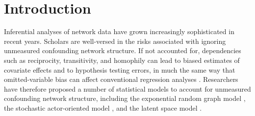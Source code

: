 \documentclass[11pt]{article}
\begin{document}

\section{Introduction}




Inferential analyses of network data have grown increasingly
sophisticated in recent years. Scholars are well-versed in the risks
associated with ignoring unmeasured confounding network structure. If
not accounted for, dependencies such as reciprocity, transitivity, and
homophily can lead to biased estimates of covariate effects and to
hypothesis testing errors, in much the same way that omitted-variable
bias can affect conventional regression analyses
\citep{ward07disputes,kinne14dependent,cranmer17critique,hays10spatial}. Researchers
have therefore proposed a number of statistical models to account for
unmeasured confounding network structure, including the exponential
random graph model \citep[ERGM;
  e.g.,][]{lazer10coevolution,cranmer11inferential,desmarais12micro-level},
the stochastic actor-oriented model \citep[SAOM;
  e.g.,][]{berardo10self-organizing,kinne14dependent}, and the latent
space model \citep[LSM;
  e.g.,][]{ward07disputes,ward07persistent,kirkland12multimember}.
\end{document}
